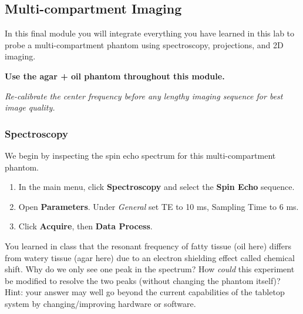 \newpage
\subsection{Multi-compartment Imaging} \label{sec:multi}

In this final module you will integrate everything you have learned in this lab to probe a multi-compartment phantom using spectroscopy, projections, and 2D imaging.

\textbf{Use the agar + oil phantom throughout this module.}


\vspace{5mm}
\noindent \emph{Re-calibrate the center frequency before any lengthy imaging sequence for best image quality.}




\subsubsection{Spectroscopy}

We begin by inspecting the spin echo spectrum for this multi-compartment phantom.

\begin{enumerate}
\item	In the main menu, click \textbf{Spectroscopy} and select the \textbf{Spin Echo} sequence.
\item	Open \textbf{Parameters}. Under \emph{General} set TE to 10 ms, Sampling Time to 6 ms.
\item	Click \textbf{Acquire}, then \textbf{Data Process}.
\end{enumerate}

\color{red}
\noindent You learned in class that the resonant frequency of fatty tissue (oil here) differs from watery tissue (agar here) due to an electron shielding effect called chemical shift. Why do we only see one peak in the spectrum? How \emph{could} this experiment be modified to resolve the two peaks (without changing the phantom itself)? Hint: your answer may well go beyond the current capabilities of the tabletop system by changing/improving hardware or software.
\color{black}

